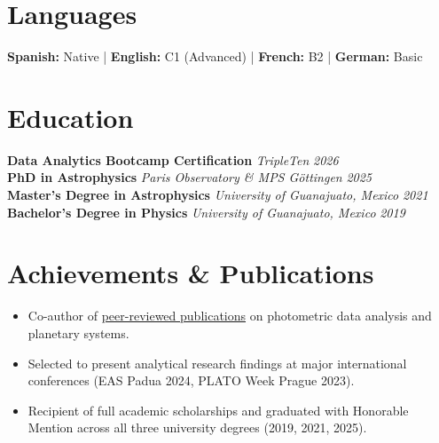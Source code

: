 \documentclass[10pt,a4paper]{article}
\begin{document}
\section*{Languages}
\textbf{Spanish:} Native \quad | \quad \textbf{English:} C1 (Advanced) \quad | \quad \textbf{French:} B2 \quad | \quad \textbf{German:} Basic

\section*{Education}
\textbf{Data Analytics Bootcamp Certification} \hfill \textit{TripleTen} \hfill \textit{2026}\\
\textbf{PhD in Astrophysics} \hfill \textit{Paris Observatory \& MPS Göttingen} \hfill \textit{2025}\\
\textbf{Master's Degree in Astrophysics} \hfill \textit{University of Guanajuato, Mexico} \hfill \textit{2021}\\
\textbf{Bachelor's Degree in Physics} \hfill \textit{University of Guanajuato, Mexico} \hfill \textit{2019}

\section*{Achievements \& Publications}
\begin{itemize}[leftmargin=1.5em]
    \item Co-author of \href{https://ui.adsabs.harvard.edu/search/fq...}{peer-reviewed publications} on photometric data analysis and planetary systems.
    \item Selected to present analytical research findings at major international conferences (EAS Padua 2024, PLATO Week Prague 2023).
    \item Recipient of full academic scholarships and graduated with Honorable Mention across all three university degrees (2019, 2021, 2025).
\end{itemize}
\end{document}
